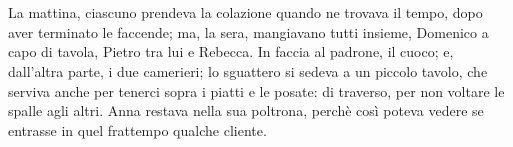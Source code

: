 \chapter{}

La mattina, ciascuno prendeva la colazione quando ne trovava il tempo, dopo aver terminato le faccende; ma, la sera, mangiavano tutti insieme, Domenico a capo di tavola, Pietro tra lui e Rebecca. In faccia al padrone, il cuoco; e, dall'altra parte, i due camerieri; lo sguattero si sedeva a un piccolo tavolo, che serviva anche per tenerci sopra i piatti e le posate: di traverso, per non voltare le spalle agli altri. Anna restava nella sua poltrona, perchè così poteva vedere se entrasse in quel frattempo qualche cliente.
